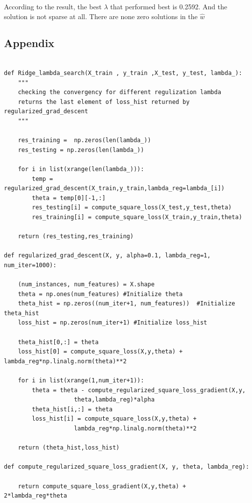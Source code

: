 \documentclass{article}
\newenvironment{problem}[2][$\bullet$]{\begin{trivlist}\large
		\item[\hskip \labelsep {\bfseries #1}\hskip \labelsep {\bfseries #2.}]}  {\end{trivlist}}
\begin{document}
\begin{problem}{5.2}
\end{problem}

According to the result, the best $\lambda$ that performed best is 0.2592. And the solution is not sparse at all. There are none zero solutions in the $\hat{w}$

\pagebreak
\begin{center}
\section{Appendix}
\end{center}
\begin{verbatim}

def Ridge_lambda_search(X_train , y_train ,X_test, y_test, lambda_): 
	"""
	checking the convergency for different regulization lambda
	returns the last element of loss_hist returned by regularized_grad_descent
	"""

	res_training =  np.zeros(len(lambda_))
	res_testing = np.zeros(len(lambda_))
	
	for i in list(xrange(len(lambda_))):
		temp = regularized_grad_descent(X_train,y_train,lambda_reg=lambda_[i])
		theta = temp[0][-1,:]
		res_testing[i] = compute_square_loss(X_test,y_test,theta)
		res_training[i] = compute_square_loss(X_train,y_train,theta)

	return (res_testing,res_training)

def regularized_grad_descent(X, y, alpha=0.1, lambda_reg=1, num_iter=1000):

	(num_instances, num_features) = X.shape
	theta = np.ones(num_features) #Initialize theta
	theta_hist = np.zeros((num_iter+1, num_features))  #Initialize theta_hist
	loss_hist = np.zeros(num_iter+1) #Initialize loss_hist
	
	theta_hist[0,:] = theta
	loss_hist[0] = compute_square_loss(X,y,theta) + lambda_reg*np.linalg.norm(theta)**2
	
	for i in list(xrange(1,num_iter+1)):
		theta = theta - compute_regularized_square_loss_gradient(X,y,
					theta,lambda_reg)*alpha
		theta_hist[i,:] = theta 
		loss_hist[i] = compute_square_loss(X,y,theta) + 
					lambda_reg*np.linalg.norm(theta)**2

	return (theta_hist,loss_hist)  

def compute_regularized_square_loss_gradient(X, y, theta, lambda_reg):

	return compute_square_loss_gradient(X,y,theta) + 2*lambda_reg*theta 



\end{verbatim}
\end{document}
